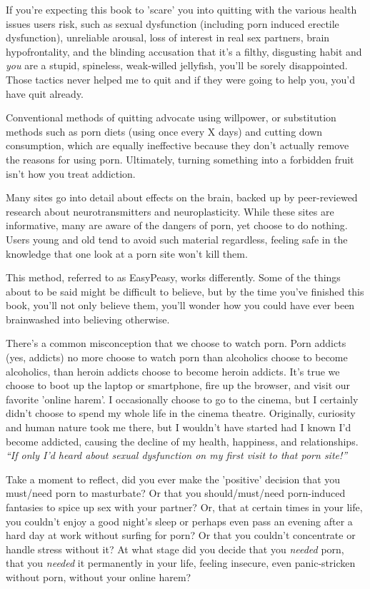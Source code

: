 \documentclass[
]{book}
\begin{document}
If you're expecting this book to 'scare' you into quitting with the various health issues users risk, such as sexual dysfunction (including porn induced erectile dysfunction), unreliable arousal, loss of interest in real sex partners, brain hypofrontality, and the blinding accusation that it's a filthy, disgusting habit and \emph{you} are a stupid, spineless, weak-willed jellyfish, you'll be sorely disappointed. Those tactics never helped me to quit and if they were going to help you, you'd have quit already.

Conventional methods of quitting advocate using willpower, or substitution methods such as porn diets (using once every X days) and cutting down consumption, which are equally ineffective because they don't actually remove the reasons for using porn. Ultimately, turning something into a forbidden fruit isn't how you treat addiction.

Many sites go into detail about effects on the brain, backed up by peer-reviewed research about neurotransmitters and neuroplasticity. While these sites are informative, many are aware of the dangers of porn, yet choose to do nothing. Users young and old tend to avoid such material regardless, feeling safe in the knowledge that one look at a porn site won't kill them.

This method, referred to as EasyPeasy, works differently. Some of the things about to be said might be difficult to believe, but by the time you've finished this book, you'll not only believe them, you'll wonder how you could have ever been brainwashed into believing otherwise.

There's a common misconception that we choose to watch porn. Porn addicts (yes, addicts) no more choose to watch porn than alcoholics choose to become alcoholics, than heroin addicts choose to become heroin addicts. It's true we choose to boot up the laptop or smartphone, fire up the browser, and visit our favorite 'online harem'. I occasionally choose to go to the cinema, but I certainly didn't choose to spend my whole life in the cinema theatre. Originally, curiosity and human nature took me there, but I wouldn't have started had I known I'd become addicted, causing the decline of my health, happiness, and relationships. \emph{``If only I'd heard about sexual dysfunction on my first visit to that porn site!''}

Take a moment to reflect, did you ever make the 'positive' decision that you must/need porn to masturbate? Or that you should/must/need porn-induced fantasies to spice up sex with your partner? Or, that at certain times in your life, you couldn't enjoy a good night's sleep or perhaps even pass an evening after a hard day at work without surfing for porn? Or that you couldn't concentrate or handle stress without it? At what stage did you decide that you \emph{needed} porn, that you \emph{needed} it permanently in your life, feeling insecure, even panic-stricken without porn, without your online harem?
\end{document}
